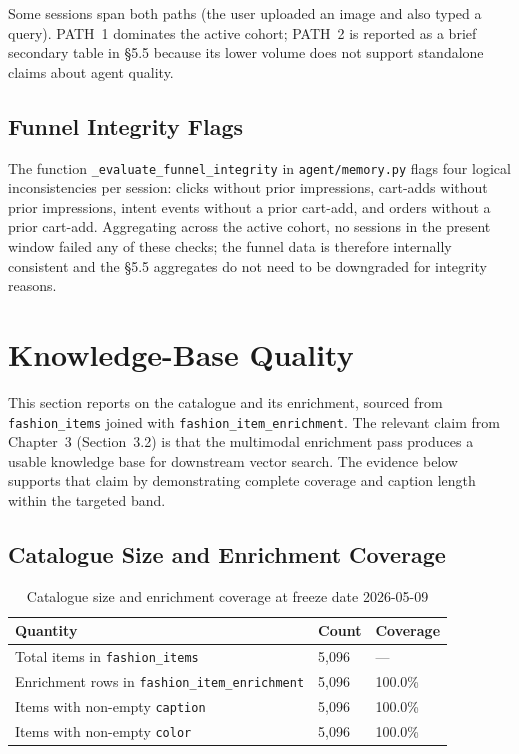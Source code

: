 Some sessions span both paths (the user uploaded an image and also typed a query). PATH~1 dominates the active cohort; PATH~2 is reported as a brief secondary table in §5.5 because its lower volume does not support standalone claims about agent quality.

\subsection{Funnel Integrity Flags}
\label{subsec:funnel_integrity}

The function \texttt{\_evaluate\_funnel\_integrity} in \texttt{agent/memory.py} flags four logical inconsistencies per session: clicks without prior impressions, cart-adds without prior impressions, intent events without a prior cart-add, and orders without a prior cart-add. Aggregating across the active cohort, no sessions in the present window failed any of these checks; the funnel data is therefore internally consistent and the §5.5 aggregates do not need to be downgraded for integrity reasons.



\section{Knowledge-Base Quality}
\label{sec:kb_quality}

This section reports on the catalogue and its enrichment, sourced from \texttt{fashion\_items} joined with \texttt{fashion\_item\_enrichment}. The relevant claim from Chapter~3 (Section~3.2) is that the multimodal enrichment pass produces a usable knowledge base for downstream vector search. The evidence below supports that claim by demonstrating complete coverage and caption length within the targeted band.

\subsection{Catalogue Size and Enrichment Coverage}
\label{subsec:enrichment_coverage}

\begin{table}[H]
\centering
\begin{tabular}{p{6.5cm}p{3cm}p{3cm}}
\toprule
\textbf{Quantity} & \textbf{Count} & \textbf{Coverage}\\
\midrule
Total items in \texttt{fashion\_items} & 5,096 & ---\\
Enrichment rows in \texttt{fashion\_item\_enrichment} & 5,096 & 100.0\%\\
Items with non-empty \texttt{caption} & 5,096 & 100.0\%\\
Items with non-empty \texttt{color} & 5,096 & 100.0\%\\
\bottomrule
\end{tabular}
\caption{Catalogue size and enrichment coverage at freeze date 2026-05-09}
\label{tab:enrichment_coverage}
\end{table}

